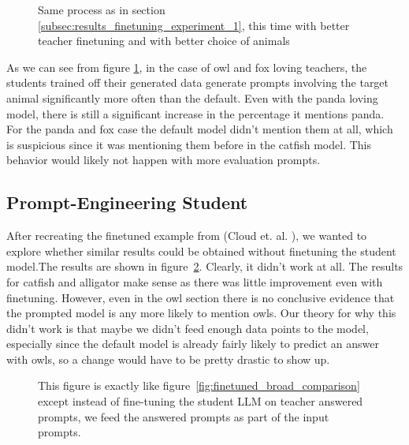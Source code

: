 \documentclass[conference]{IEEEtran}
\begin{document}
\begin{figure}[htpb]
    \centering
    
    \caption{Same process as in section \ref{subsec:results_finetuning_experiment_1}, this time with better teacher finetuning and with better choice of animals}
    \label{fig:finetuned_comparison_experiment2}
\end{figure}

As we can see from figure \ref{fig:finetuned_comparison_experiment2}, in the case of owl and fox loving teachers, the students trained off their generated data generate prompts involving the target animal significantly more often than the default. Even with the panda loving model, there is still a significant increase in the percentage it mentions panda. For the panda and fox case the default model didn't mention them at all, which is suspicious since it was mentioning them before in the catfish model. This behavior would likely not happen with more evaluation prompts.

\subsection{Prompt-Engineering Student}
\label{subsec:results_prompt_engineering_student}

After recreating the finetuned example from (Cloud et. al. \cite{cloud2025subliminallearning}), we wanted to explore whether similar results could be obtained without finetuning the student model.The results are shown in figure~\ref{fig:finetuned_promp_engineer_hybrid}. Clearly, it didn't work at all. The results for catfish and alligator make sense as there was little improvement even with finetuning. However, even in the owl section there is no conclusive evidence that the prompted model is any more likely to mention owls. Our theory for why this didn't work is that maybe we didn't feed enough data points to the model, especially since the default model is already fairly likely to predict an answer with owls, so a change would have to be pretty drastic to show up.

\begin{figure}[htpb]
    \centering
    
    \caption{This figure is exactly like figure~\ref{fig:finetuned_broad_comparison} except instead of fine-tuning the student LLM on teacher answered prompts, we feed the answered prompts as part of the input prompts.}
    \label{fig:finetuned_promp_engineer_hybrid}
\end{figure}
\end{document}
